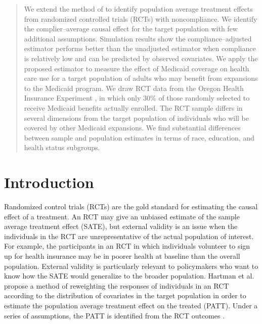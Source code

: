 \documentclass[12pt]{article}
\begin{document}
\begin{singlespace} %
\maketitle  
\thispagestyle{empty}
\begin{abstract}  
\noindent 
We extend the method of \citet{Hartman} to identify population average treatment effects from randomized controlled trials (RCTs) with noncompliance. We identify the complier--average causal effect for the target population with few additional assumptions. Simulation results show the compliance--adjusted estimator performs better than the unadjusted estimator when compliance is relatively low and can be predicted by observed covariates. We apply the proposed estimator to measure the effect of Medicaid coverage on health care use for a target population of adults who may benefit from expansions to the Medicaid program. We draw RCT data from the Oregon Health Insurance Experiment \citep{finkelstein2012}, in which only $30\%$ of those randomly selected to receive Medicaid benefits actually enrolled. The RCT sample differs in several dimensions from the target population of individuals who will be covered by other Medicaid expansions. We find substantial differences between sample and population estimates in terms of race, education, and health status subgroups. 

\end{abstract}	
\end{singlespace}
\pagebreak
\setcounter{page}{1} %

\vspace{20mm}

\section{Introduction}
Randomized control trials (RCTs) are the gold standard for estimating the causal effect of a treatment.  An RCT may give an unbiased estimate of the sample average treatment effect (SATE), but external validity is an issue when the individuals in the RCT are unrepresentative of the actual population of interest.  For example, the participants in an RCT in which individuals volunteer to sign up for health insurance may be in poorer health at baseline than the overall population.  External validity is particularly relevant to policymakers who want to know how the SATE would generalize to the broader population. Hartman et al. propose a method of reweighting the responses of individuals in an RCT according to the distribution of covariates in the target population in order to estimate the population average treatment effect on the treated (PATT).  Under a series of assumptions, the PATT is identified from the RCT outcomes \citep{Hartman}. 
\end{document}
